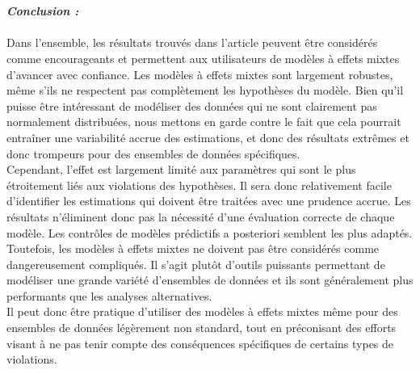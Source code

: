 \documentclass{article}
\begin{document}
 \\  \\
        
  

  
\textbf{\textit{  Conclusion :}} \\ \\


Dans l'ensemble, les résultats trouvés dans l’article peuvent être considérés comme encourageants et permettent aux utilisateurs de modèles à effets mixtes d'avancer avec confiance. Les modèles à effets mixtes sont largement robustes, même s'ils ne respectent pas complètement les hypothèses du modèle. Bien qu'il puisse être intéressant de modéliser des données qui ne sont clairement pas normalement distribuées, nous mettons en garde contre le fait que cela pourrait entraîner une variabilité accrue des estimations, et donc des résultats extrêmes et donc trompeurs pour des ensembles de données spécifiques. \\ 

Cependant, l'effet est largement limité aux paramètres qui sont le plus étroitement liés aux violations des hypothèses. Il sera donc relativement facile d'identifier les estimations qui doivent être traitées avec une prudence accrue. Les résultats n'éliminent donc pas la nécessité d'une évaluation correcte de chaque modèle. Les contrôles de modèles prédictifs a posteriori semblent les plus adaptés. Toutefois, les modèles à effets mixtes ne doivent pas être considérés comme dangereusement compliqués. Il s'agit plutôt d'outils puissants permettant de modéliser une grande variété d'ensembles de données et ils sont généralement plus performants que les analyses alternatives.\\
Il peut donc être pratique d’utiliser des modèles à effets mixtes même pour des ensembles de données légèrement non standard, tout en préconisant des efforts visant à ne pas tenir compte des conséquences spécifiques de certains types de violations.
\end{document}

